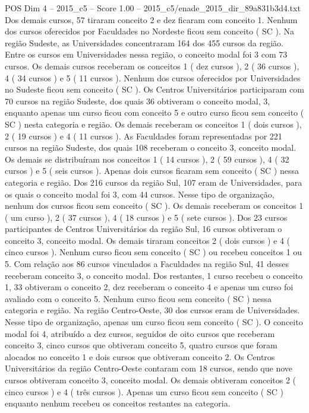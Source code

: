 \begin{textsample}{POS Dim 4 – 2015\_c5 – Score 1.00 – 2015\_c5/enade\_2015\_dir\_89a831b3d4.txt}
Dos demais cursos, 57 tiraram conceito 2 e dez ficaram com conceito 1.
Nenhum dos cursos oferecidos por Faculdades no Nordeste ficou sem conceito ( SC ).
Na região Sudeste, as Universidades concentraram 164 dos 455 cursos da região.
Entre os cursos em Universidades nessa região, o conceito modal foi 3 com 73 cursos.
Os demais cursos receberam os conceitos 1 ( dez cursos ), 2 ( 36 cursos ), 4 ( 34 cursos ) e 5 ( 11 cursos ).
Nenhum dos cursos oferecidos por Universidades no Sudeste ficou sem conceito ( SC ).
Os Centros Universitários participaram com 70 cursos na região Sudeste, dos quais 36 obtiveram o conceito modal, 3, enquanto apenas um curso ficou com conceito 5 e outro curso ficou sem conceito ( SC ) nesta categoria e região.
Os demais receberam os conceitos 1 ( dois cursos ), 2 ( 19 cursos ) e 4 ( 11 cursos ).
As Faculdades foram representadas por 221 cursos na região Sudeste, dos quais 108 receberam o conceito 3, conceito modal.
Os demais se distribuíram nos conceitos 1 ( 14 cursos ), 2 ( 59 cursos ), 4 ( 32 cursos ) e 5 ( seis cursos ).
Apenas dois cursos ficaram sem conceito ( SC ) nessa categoria e região.
Dos 216 cursos da região Sul, 107 eram de Universidades, para os quais o conceito modal foi 3, com 44 cursos.
Nesse tipo de organização, nenhum dos cursos ficou sem conceito ( SC ).
Os demais receberam os conceitos 1 ( um curso ), 2 ( 37 cursos ), 4 ( 18 cursos ) e 5 ( sete cursos ).
Dos 23 cursos participantes de Centros Universitários da região Sul, 16 cursos obtiveram o conceito 3, conceito modal.
Os demais tiraram conceitos 2 ( dois cursos ) e 4 ( cinco cursos ).
Nenhum curso ficou sem conceito ( SC ) ou recebeu conceitos 1 ou 5.
Com relação aos 86 cursos vinculados a Faculdades na região Sul, 41 desses receberam conceito 3, o conceito modal.
Dos restantes, 1 curso recebeu o conceito 1, 33 obtiveram o conceito 2, dez receberam o conceito 4 e apenas um curso foi avaliado com o conceito 5.
Nenhum curso ficou sem conceito ( SC ) nessa categoria e região.
Na região Centro-Oeste, 30 dos cursos eram de Universidades.
Nesse tipo de organização, apenas um curso ficou sem conceito ( SC ).
O conceito modal foi 4, atribuído a dez cursos, seguidos de oito cursos que receberam conceito 3, cinco cursos que obtiveram conceito 5, quatro cursos que foram alocados no conceito 1 e dois cursos que obtiveram conceito 2.
Os Centros Universitários da região Centro-Oeste contaram com 18 cursos, sendo que nove cursos obtiveram conceito 3, conceito modal.
Os demais obtiveram conceitos 2 ( cinco cursos ) e 4 ( três cursos ).
Apenas um curso ficou sem conceito ( SC ) enquanto nenhum recebeu os conceitos restantes na categoria.

\end{textsample}
